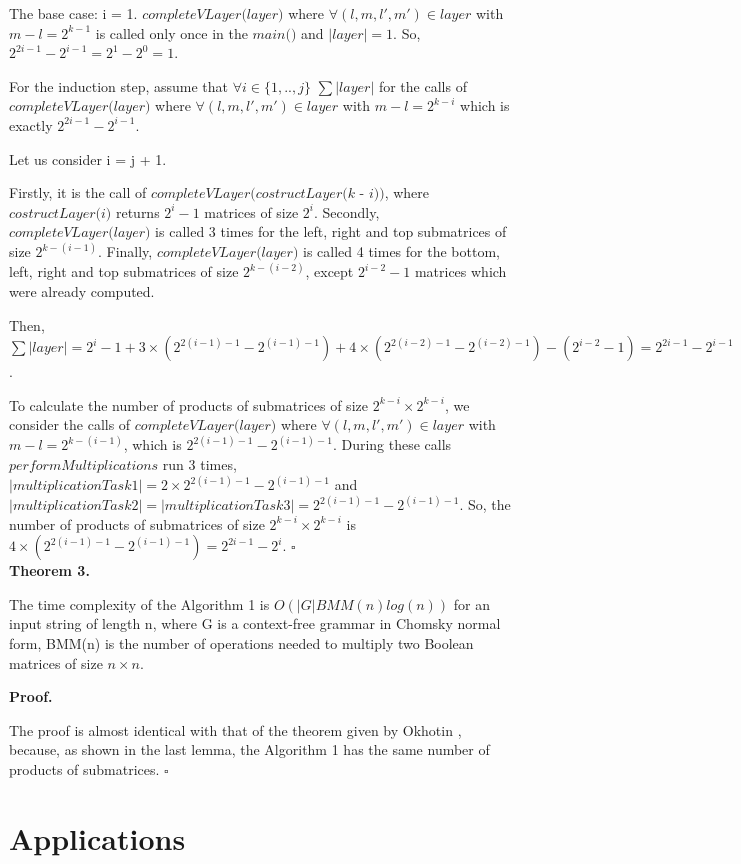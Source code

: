\documentclass{article}
\begin{document}
The base case: i = 1. $\textit{completeVLayer(layer)}$ where $\forall (l, m, l', m') \in layer$ with $m - l = 2^{k - 1}$ is called only once in the  $\textit{main()}$ and $|layer| = 1$. So, $2^{2i - 1} - 2^{i - 1} = 2^1 - 2^0 = 1$.

For the induction step, assume that $\forall i \in \{ 1, .., j\}$ $\sum{|layer|}$ for the calls of $\textit{completeVLayer(layer)}$ where $\forall (l, m, l', m') \in layer$ with $m - l = 2^{k - i}$  which is exactly $2^{2i - 1} - 2^{i - 1}$.

Let us consider i = j + 1. 

Firstly, it is the call of $\textit{completeVLayer(costructLayer(k - i))}$, where $\textit{costructLayer(i)}$ returns $2^i - 1$ matrices of size $2^i$. Secondly, $\textit{completeVLayer(layer)}$ is called 3 times for the left, right and top submatrices of size $2^{k - (i - 1)}$. Finally, $\textit{completeVLayer(layer)}$ is called 4 times for the bottom, left, right and top submatrices of size $2^{k - (i - 2)}$, except $2^{i - 2} - 1$ matrices which were already computed.

Then, $\sum{|layer|} = 2^{i} - 1 + 3 \times (2^{2(i - 1) - 1} - 2^{(i - 1) - 1}) + 4 \times (2^{2(i - 2) - 1} - 2^{(i - 2) - 1}) - (2^{i - 2} - 1) = 2^{2i - 1} - 2^{i - 1}$. 

To calculate the number of products of submatrices of size $2^{k - i} \times 2^{k - i}$, we consider the calls of \linebreak $\textit{completeVLayer(layer)}$ where $\forall (l, m, l', m') \in layer$ with $m - l = 2^{k - (i - 1)}$, which is $2^{2(i - 1) - 1} - 2^{(i - 1) - 1}$. During these calls $performMultiplications$ run 3 times, $|multiplicationTask1| = 2 \times 2^{2(i - 1) - 1} - 2^{(i - 1) - 1}$ and \linebreak $|multiplicationTask2| = |multiplicationTask3| = 2^{2(i - 1) - 1} - 2^{(i - 1) - 1}$. So, the number of products of submatrices of size $2^{k - i} \times 2^{k - i}$ is $4 \times (2^{2(i - 1) - 1} - 2^{(i - 1) - 1}) = 2^{2i - 1} - 2^{i}$. $\square$\\

\textbf{Theorem 3.}

The time complexity of the Algorithm 1 is $O(|G|BMM(n)log(n))$ for an input string of length n, where G is a context-free grammar in Chomsky normal form, BMM(n) is the number of operations needed to multiply two Boolean matrices of size $n \times n$.

\textbf{Proof.}

The proof is almost identical with that of the theorem given by Okhotin \citep{okh}, because, as shown in the last lemma, the Algorithm 1 has the same number of products of submatrices. $\square$\\


\section{Applications}




\end{document}
